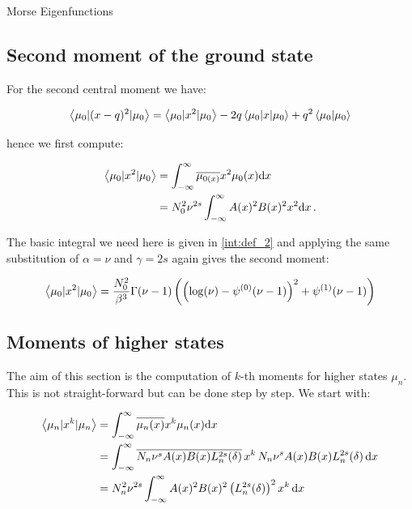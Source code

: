 \begin{chapter}{Morse Eigenfunctions}
\subsection{Second moment of the ground state}


For the second central moment we have:

\begin{equation}
  \left\langle \mu_{0} | (x-q)^{2} | \mu_{0} \right\rangle
  = \left\langle \mu_{0} | x^{2} | \mu_{0} \right\rangle
  - 2 q \left\langle \mu_{0} | x | \mu_{0} \right\rangle
  + q^{2} \left\langle \mu_{0} | \mu_{0} \right\rangle
\end{equation}

hence we first compute:

\begin{align}
  \left\langle \mu_{0} | x^{2} | \mu_{0} \right\rangle
  & = \int_{-\infty}^{\infty} \overline{\mu_{0(x)}} x^{2} \mu_{0}(x) \mathrm{d}x \\
  & =   N_{0}^{2} \nu^{2s} \int_{-\infty}^{\infty} A(x)^{2} B(x)^{2} x^{2} \mathrm{d}x \,.
\end{align}

The basic integral we need here is given in \eqref{int:def_2} and
applying the same substitution of $\alpha=\nu$ and $\gamma=2s$ again
 gives the second moment:

\begin{align}
    \left\langle \mu_{0} | x^{2} | \mu_{0} \right\rangle
    = \frac{N_{0}^{2}}{\beta^{3}} \Gamma(\nu-1) \left(\left(\log(\nu) - \psi^{(0)}(\nu-1) \right)^{2} + \psi^{(1)}(\nu-1) \right)
\end{align}


\subsection{Moments of higher states}


The aim of this section is the computation of $k$-th moments for higher states $\mu_{n}$.
This is not straight-forward but can be done step by step. We start with:

\begin{align}
  \label{eq:def_kth_mom}
  \left\langle \mu_{n} | x^{k} | \mu_{n} \right\rangle
  & = \int_{-\infty}^{\infty} \overline{\mu_{n}(x)} x^{k} \mu_{n}(x) \mathrm{d}x \\
  & = \int_{-\infty}^{\infty} \overline{N_{n} \nu^{s} A(x) B(x) L_{n}^{2s}(\delta)}
                                \, x^{k} \,
                                N_{n} \nu^{s} A(x) B(x) L_{n}^{2s}(\delta) \,\mathrm{d}x \\
  & =   N_{n}^{2} \nu^{2s} \int_{-\infty}^{\infty} A(x)^{2} B(x)^{2} \left( L_{n}^{2s}(\delta) \right)^{2} x^{k} \,\mathrm{d}x
\end{align}


\end{chapter}
